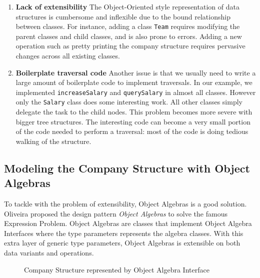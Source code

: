 \begin{enumerate}

\item {\bf Lack of extensibility} The Object-Oriented style
  representation of data structures is cumbersome and
  inflexible due to the bound relationship between classes. For
  instance, adding a class \lstinline{Team} requires modifying the
  parent classes and child classes, and is also prone to errors.
  Adding a new operation such as pretty
  printing the company structure requires pervasive changes across all
  existing classes.

\item {\bf Boilerplate traversal code} Another issue is
  that we usually need to write a large amount of boilerplate code to
  implement traversals. In
  our example, we implemented \lstinline{increaseSalary} and
  \lstinline{querySalary} in almost all classes. However only the
  \lstinline{Salary} class does some interesting work. All other classes
  simply delegate the task to the child nodes. This problem becomes
  more severe with bigger tree structures. The interesting code can
  become a very small portion of the code needed to perform a
  traversal: most of the code is doing tedious
  walking of the structure.

\end{enumerate}

\subsection{Modeling the Company Structure with Object Algebras}

To tackle with the problem of extensibility, Object Algebras is a good solution.  Oliveira proposed the design pattern \emph{Object Algebras}\cite{bruno12oa} to solve the famous Expression Problem. Object Algebras are classes that implement Object Algebra Interfaces where the type parameters represents the algebra classes. With this extra layer of generic type parameters, Object Algebras is extensible on both data variants and operations.  

\begin{figure}[tb]
\vspace{-.1in}
\caption{Company Structure represented by Object Algebra Interface}
\label{syb_tree}
\end{figure}

